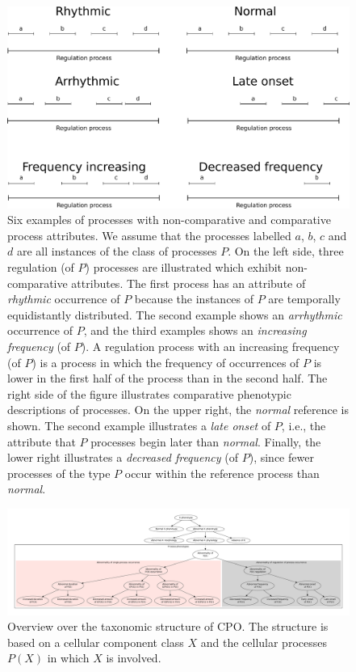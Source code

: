 \documentclass[12pt]{article}
\begin{document}
\begin{figure}
  \centering
  \includegraphics[width=1\textwidth]{processpatterns.pdf}
  
  \caption{\label{fig:patterns}Six examples of processes with
    non-comparative and comparative process attributes.  We assume
    that the processes labelled $a$, $b$, $c$ and $d$ are all
    instances of the class of processes $P$.  On the left side, three
    regulation (of $P$) processes are illustrated which exhibit
    non-comparative attributes. The first process has an attribute of
    {\em rhythmic} occurrence of $P$ because the instances of $P$ are
    temporally equidistantly distributed. The second example shows an
    {\em arrhythmic} occurrence of $P$, and the third examples shows
    an {\em increasing frequency} (of $P$). A regulation process with
    an increasing frequency (of $P$) is a process in which the
    frequency of occurrences of $P$ is lower in the first half of the
    process than in the second half. The right side of the figure
    illustrates comparative phenotypic descriptions of processes. On
    the upper right, the {\em normal} reference is shown. The second
    example illustrates a {\em late onset} of $P$, i.e., the attribute
    that $P$ processes begin later than {\em normal}. Finally, the
    lower right illustrates a {\em decreased frequency} (of $P$),
    since fewer processes of the type $P$ occur within the reference
    process than {\em normal}.}
\end{figure}

\begin{figure}
  \centering
  \includegraphics[width=1.2\textwidth, height=.4\textheight, angle=270]{overview.pdf}
  \caption{Overview over the taxonomic structure of CPO. The structure
    is based on a cellular component class $X$ and the cellular
    processes $P(X)$ in which $X$ is involved.\label{fig:overview}}
\end{figure}
\end{document}
